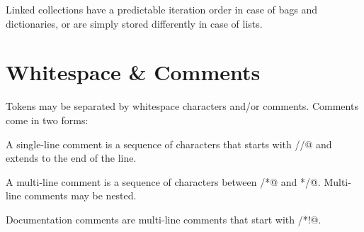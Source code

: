 Linked collections have a predictable iteration order in case of bags and dictionaries, or are simply stored differently in case of lists.  

\section{Whitespace \& Comments}\label{sec:whitespacecomments}

Tokens may be separated by whitespace characters and/or comments. Comments come in two forms: 

A single-line comment is a sequence of characters that starts with \lstinline@//@ and extends to the end of the line. 

A multi-line comment is a sequence of characters between \lstinline@/*@ and \lstinline@*/@. Multi-line comments may be nested. 

Documentation comments are multi-line comments that start with \lstinline@/*!@. 

